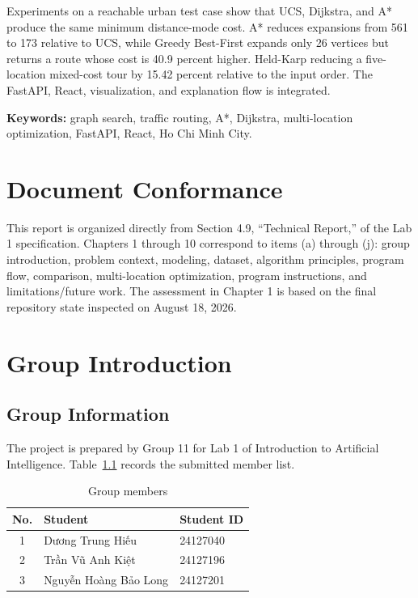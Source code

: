 \documentclass[12pt,a4paper,oneside]{report}
\begin{document}
Experiments on a reachable urban test case show that UCS, Dijkstra, and A*
produce the same minimum distance-mode cost. A* reduces expansions from 561 to
173 relative to UCS, while Greedy Best-First expands only 26 vertices but returns
a route whose cost is 40.9 percent higher. Held-Karp
reducing a five-location mixed-cost tour by 15.42 percent relative to the input
order. The FastAPI, React, visualization, and explanation flow is integrated.

\noindent\textbf{Keywords:} graph search, traffic routing, A*, Dijkstra,
multi-location optimization, FastAPI, React, Ho Chi Minh City.

\chapter*{Document Conformance}
This report is organized directly from Section 4.9, ``Technical Report,'' of
the Lab 1 specification. Chapters 1 through 10 correspond to items (a) through
(j): group introduction, problem context, modeling, dataset, algorithm
principles, program flow, comparison, multi-location optimization, program
instructions, and limitations/future work. The assessment in Chapter 1 is based
on the final repository state inspected on August 18, 2026.

\tableofcontents
\listoffigures
\listoftables
\clearpage
{}

\chapter{Group Introduction}

\section{Group Information}
The project is prepared by Group 11 for Lab 1 of Introduction to Artificial
Intelligence. Table~\ref{tab:members} records the submitted member list.

\begin{table}[H]
\centering
\caption{Group members}
\label{tab:members}
\begin{tabular}{cll}
\toprule
\textbf{No.} & \textbf{Student} & \textbf{Student ID}\\
\midrule
1 & Dương Trung Hiếu & 24127040\\
2 & Trần Vũ Anh Kiệt & 24127196\\
3 & Nguyễn Hoàng Bảo Long & 24127201\\
\bottomrule
\end{tabular}
\end{table}
\end{document}
